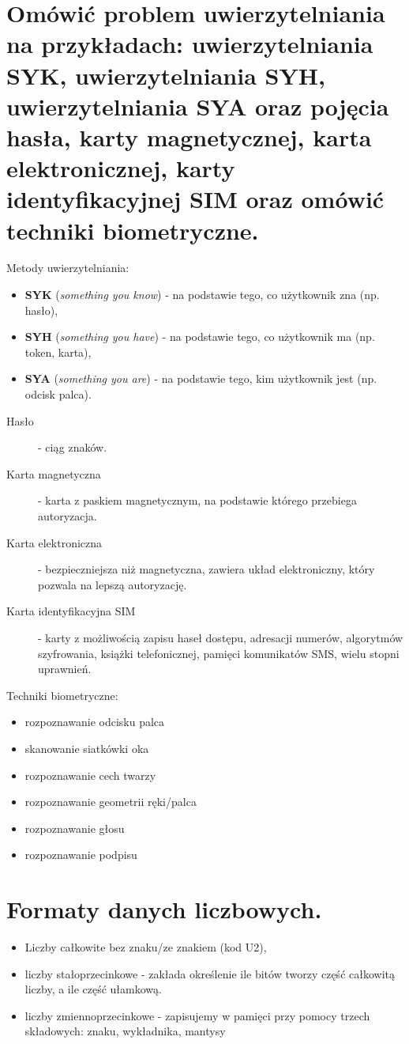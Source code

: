 \documentclass[12pt,a4paper]{article}
\begin{document}
	\section{Omówić problem uwierzytelniania na przykładach: uwierzytelniania SYK, uwierzytelniania SYH, uwierzytelniania SYA oraz pojęcia hasła, karty magnetycznej, karta elektronicznej, karty identyfikacyjnej SIM oraz omówić techniki biometryczne.}
	Metody uwierzytelniania:
	\begin{itemize}
		\item \textbf{SYK} (\textit{something you know}) - na podstawie tego, co użytkownik zna (np. hasło),
		\item \textbf{SYH} (\textit{something you have}) - na podstawie tego, co użytkownik ma (np. token, karta),
		\item \textbf{SYA} (\textit{something you are}) - na podstawie tego, kim użytkownik jest (np. odcisk palca).
	\end{itemize}

\begin{description}
	\item[Hasło] - ciąg znaków.
	\item[Karta magnetyczna] - karta z paskiem magnetycznym, na podstawie którego przebiega autoryzacja.
	\item[Karta elektroniczna] - bezpieczniejsza niż magnetyczna, zawiera układ elektroniczny, który pozwala na lepszą autoryzację.
	\item[Karta identyfikacyjna SIM] - karty z możliwością zapisu haseł dostępu, adresacji numerów, algorytmów szyfrowania, książki telefonicznej, pamięci komunikatów SMS, wielu stopni uprawnień.
\end{description}

Techniki biometryczne:
	\begin{itemize}
		\item rozpoznawanie odcisku palca
		\item skanowanie siatkówki oka
		\item rozpoznawanie cech twarzy
		\item rozpoznawanie geometrii ręki/palca
		\item rozpoznawanie głosu
		\item rozpoznawanie podpisu
	\end{itemize}

	\section{Formaty danych liczbowych.}
	\begin{itemize}
		\item Liczby całkowite bez znaku/ze znakiem (kod U2), 
		\item liczby stałoprzecinkowe - zakłada określenie ile bitów tworzy część całkowitą liczby, a ile część ułamkową. 
		\item liczby zmiennoprzecinkowe - zapisujemy w pamięci przy pomocy trzech składowych: znaku, wykładnika, mantysy
	\end{itemize}
\end{document}
